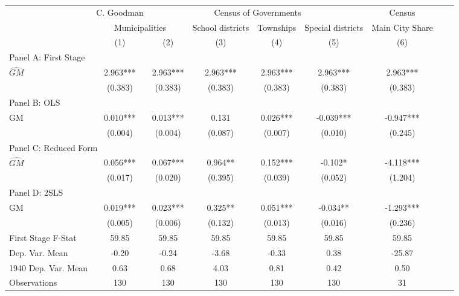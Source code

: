  \begin{tabular}{l*{8}{c}} \toprule
&\multicolumn{1}{c}{C. Goodman}&\multicolumn{4}{c}{Census of Governments}&\multicolumn{1}{c}{Census}\\\cmidrule(lr){2-2}\cmidrule(lr){3-6}\cmidrule(lr){7-7}
&\multicolumn{2}{c}{Municipalities}&\multicolumn{1}{c}{School districts}&\multicolumn{1}{c}{Townships}&\multicolumn{1}{c}{Special districts}&\multicolumn{1}{c}{Main City Share}\\\cmidrule(lr){2-3}\cmidrule(lr){4-6}\cmidrule(lr){7-7}
&\multicolumn{1}{c}{(1)}&\multicolumn{1}{c}{(2)}&\multicolumn{1}{c}{(3)}&\multicolumn{1}{c}{(4)}&\multicolumn{1}{c}{(5)}&\multicolumn{1}{c}{(6)}\\
\cmidrule(lr){1-7}
\multicolumn{6}{l}{Panel A: First Stage}\\
\cmidrule(lr){1-7}
$\widehat{GM}$  &    2.963***&    2.963***&    2.963***&    2.963***&    2.963***&    2.963***\\
                &  (0.383)   &  (0.383)   &  (0.383)   &  (0.383)   &  (0.383)   &  (0.383)   \\
\cmidrule(lr){1-7}
\multicolumn{6}{l}{Panel B: OLS}\\
\cmidrule(lr){1-7}
GM              &    0.010***&    0.013***&    0.131   &    0.026***&   -0.039***&   -0.947***\\
                &  (0.004)   &  (0.004)   &  (0.087)   &  (0.007)   &  (0.010)   &  (0.245)   \\
\cmidrule(lr){1-7}
\multicolumn{6}{l}{Panel C: Reduced Form}\\
\cmidrule(lr){1-7}
$\widehat{GM}$  &    0.056***&    0.067***&    0.964** &    0.152***&   -0.102*  &   -4.118***\\
                &  (0.017)   &  (0.020)   &  (0.395)   &  (0.039)   &  (0.052)   &  (1.204)   \\
\cmidrule(lr){1-7}
\multicolumn{6}{l}{Panel D: 2SLS}\\
\cmidrule(lr){1-7}
GM              &    0.019***&    0.023***&    0.325** &    0.051***&   -0.034** &   -1.293***\\
                &  (0.005)   &  (0.006)   &  (0.132)   &  (0.013)   &  (0.016)   &  (0.236)   \\
\midrule
First Stage F-Stat&    59.85   &    59.85   &    59.85   &    59.85   &    59.85   &    59.85   \\
Dep. Var. Mean  &    -0.20   &    -0.24   &    -3.68   &    -0.33   &     0.38   &   -25.87   \\
1940 Dep. Var. Mean&     0.63   &     0.68   &     4.03   &     0.81   &     0.42   &     0.50   \\
Observations    &      130   &      130   &      130   &      130   &      130   &       31   \\
       \bottomrule \end{tabular}
